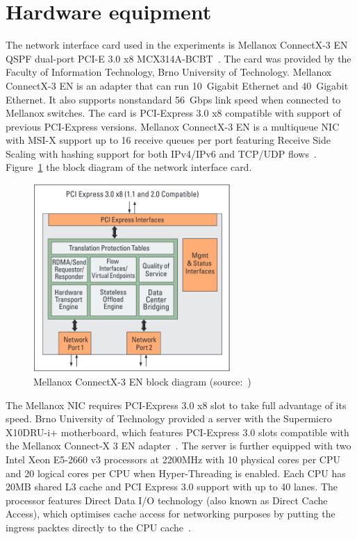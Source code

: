
\section{Hardware equipment}\label{sec:analysis-hardware}
The network interface card used in the experiments is
Mellanox ConnectX-3 EN QSPF dual-port PCI-E 3.0 x8 MCX314A-BCBT~\cite{mellanox-product-brief}.
The card was provided by the Faculty of Information Technology, Brno University of Technology.
Mellanox ConnectX-3 EN is an adapter that can run 10~Gigabit Ethernet and 40~Gigabit Ethernet.
It also supports nonstandard 56~Gbps link speed when connected to Mellanox switches.
The card is PCI-Express 3.0 x8 compatible with support of previous PCI-Express versions.
Mellanox ConnectX-3 EN is a multiqueue NIC with MSI-X support up to 16 receive queues per port
featuring Receive Side Scaling with hashing support for both IPv4/IPv6 and TCP/UDP flows~\cite{mellanox-silicon, mellanox-user-manual}.
Figure~\ref{fig:setup-mlx-block-diagram} the block diagram of the network interface card.

\begin{figure}
	\centering
	\includegraphics[width=7.5cm,keepaspectratio]{fig/mlx-block-diagram.png}
	\caption{Mellanox ConnectX-3 EN block diagram (source:~\cite{mellanox-silicon})}
	\label{fig:setup-mlx-block-diagram}
	\bigskip
\end{figure}

The Mellanox NIC requires PCI-Express 3.0 x8 slot to take full advantage of its speed.
Brno University of Technology provided a server with
the Supermicro X10DRU-i+ motherboard, which
features PCI-Express 3.0 slots compatible with the Mellanox Connect-X 3 EN adapter~\cite{supermicro-board}.
The server is further equipped with two Intel Xeon E5-2660 v3 processors at 2200MHz with 10 physical cores per CPU
and 20 logical cores per CPU when Hyper-Threading is enabled.
Each CPU has 20MB shared L3 cache and PCI Express 3.0 support with up to 40 lanes.
The processor features Direct Data I/O technology (also known as Direct Cache Access),
which optimises cache access for networking purposes by putting the ingress packtes directly to the CPU cache~\cite{intel-xeon-cpu}.

